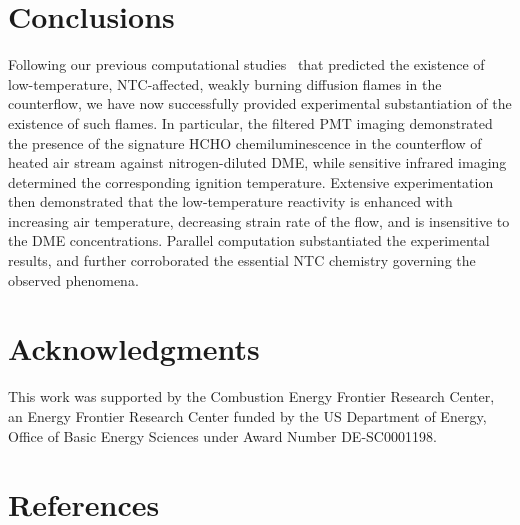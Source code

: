 \documentclass[review,3p,times]{elsarticleUS}
\begin{document}
\section{Conclusions}        

Following our previous computational studies~\cite{law12,zhao13} that predicted the existence of low-temperature, NTC-affected, weakly burning diffusion flames in the counterflow, we have now successfully provided experimental substantiation of the existence of such flames.  In particular, the filtered PMT imaging demonstrated the presence of the signature HCHO chemiluminescence in the counterflow of heated air stream against nitrogen-diluted DME, while sensitive infrared imaging determined the corresponding ignition temperature.  Extensive experimentation then demonstrated that the low-temperature reactivity is enhanced with increasing air temperature, decreasing strain rate of the flow, and is insensitive to the DME concentrations.  Parallel computation substantiated the experimental results, and further corroborated the essential NTC chemistry governing the observed phenomena.

\section*{Acknowledgments}
This work was supported by the Combustion Energy Frontier Research Center, an Energy Frontier Research Center funded by the US Department of Energy, Office of Basic Energy Sciences under Award Number DE-SC0001198.

\section*{References}



\renewcommand{\thefigure}{\arabic{figure}}
\renewcommand{\thetable}{\arabic{table}}
\end{document}
